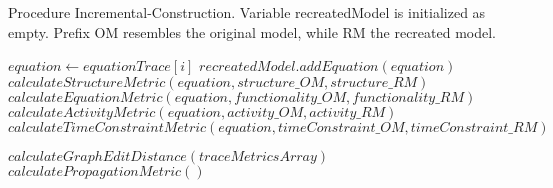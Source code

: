	\begin{algorithm}
	\caption{Procedure Incremental-Construction. Variable recreatedModel is initialized as empty. Prefix OM resembles the original model, while RM the recreated model. }
	\label{incrementalConstruction}
	\begin{algorithmic}[1]
			\State $equation \gets equationTrace[i]$
			\State $recreatedModel.addEquation(equation)$
			\State $calculateStructureMetric(equation, structure\_OM, structure\_RM)$
			\State $calculateEquationMetric(equation, functionality\_OM, functionality\_RM)$
			\State $calculateActivityMetric(equation, activity\_OM, activity\_RM)$
			\State $calculateTimeConstraintMetric(equation, timeConstraint\_OM, timeConstraint\_RM)$
		\EndFor
		
		\State $calculateGraphEditDistance(traceMetricsArray)$
		\State $calculatePropagationMetric()$
				
		\EndProcedure
	\end{algorithmic}
	\end{algorithm}